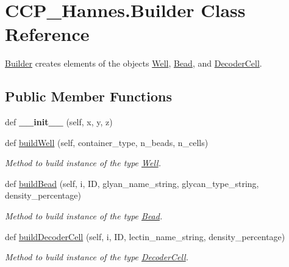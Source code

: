 \hypertarget{class_c_c_p___hannes_1_1_builder}{}\section{C\+C\+P\+\_\+\+Hannes.\+Builder Class Reference}
\label{class_c_c_p___hannes_1_1_builder}


\mbox{\hyperlink{class_c_c_p___hannes_1_1_builder}{Builder}} creates elements of the objects \mbox{\hyperlink{class_c_c_p___hannes_1_1_well}{Well}}, \mbox{\hyperlink{class_c_c_p___hannes_1_1_bead}{Bead}}, and \mbox{\hyperlink{class_c_c_p___hannes_1_1_decoder_cell}{Decoder\+Cell}}.  


\subsection*{Public Member Functions}
\begin{DoxyCompactItemize}
\item 
\mbox{\label{class_c_c_p___hannes_1_1_builder_a4ac93ff13f014c884aac67f4f3114087}} 
def {\bfseries \+\_\+\+\_\+init\+\_\+\+\_\+} (self, x, y, z)
\item 
def \mbox{\hyperlink{class_c_c_p___hannes_1_1_builder_a0fec345dd5970ba6c4bf0ff698e967f8}{build\+Well}} (self, container\+\_\+type, n\+\_\+beads, n\+\_\+cells)
\begin{DoxyCompactList}\small\item\em Method to build instance of the type \mbox{\hyperlink{class_c_c_p___hannes_1_1_well}{Well}}. \end{DoxyCompactList}\item 
def \mbox{\hyperlink{class_c_c_p___hannes_1_1_builder_aecc5d7647ff893b666d0041008b496fd}{build\+Bead}} (self, i, ID, glyan\+\_\+name\+\_\+string, glycan\+\_\+type\+\_\+string, density\+\_\+percentage)
\begin{DoxyCompactList}\small\item\em Method to build instance of the type \mbox{\hyperlink{class_c_c_p___hannes_1_1_bead}{Bead}}. \end{DoxyCompactList}\item 
def \mbox{\hyperlink{class_c_c_p___hannes_1_1_builder_a27d07fcf53d3fa8a81b829bb4eea7cc7}{build\+Decoder\+Cell}} (self, i, ID, lectin\+\_\+name\+\_\+string, density\+\_\+percentage)
\begin{DoxyCompactList}\small\item\em Method to build instance of the type \mbox{\hyperlink{class_c_c_p___hannes_1_1_decoder_cell}{Decoder\+Cell}}. \end{DoxyCompactList}\end{DoxyCompactItemize}
